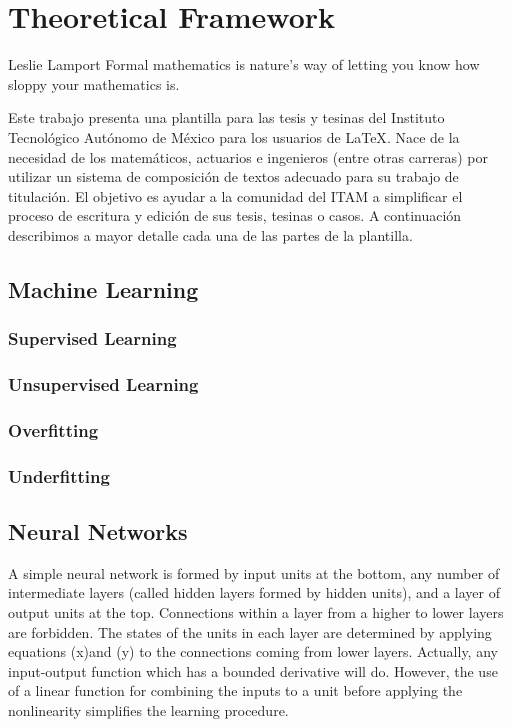 \chapter{Theoretical Framework}
\label{ch:teo}

\begin{chapterquote}{Leslie Lamport}
	Formal mathematics is nature's way of letting you know how sloppy
your mathematics is.
\end{chapterquote}

Este trabajo presenta una plantilla para las tesis y tesinas del Instituto Tecnológico Autónomo de México para los usuarios de \LaTeX \cite{lamport1994latex}. Nace de la necesidad de los matemáticos, actuarios e ingenieros (entre otras carreras) por utilizar un sistema de composición de textos adecuado para su trabajo de titulación. El objetivo es ayudar a la comunidad del ITAM a simplificar el proceso de escritura y edición de sus tesis, tesinas o casos. A continuación describimos a mayor detalle cada una de las partes de la plantilla.


\section{Machine Learning}
\subsection{Supervised Learning}
\subsection{Unsupervised Learning}
\subsection{Overfitting}
\subsection{Underfitting}

\section{Neural Networks}
A simple neural network is formed by input units at the bottom, any number of intermediate layers (called hidden layers formed by hidden units), and a layer of output units at the top. Connections within a layer from a higher to lower layers are forbidden. The states of the units in each layer are determined by applying equations (x)and (y) to the connections coming from lower layers. Actually, any input-output function which has a bounded derivative will do. However, the use of a linear function for combining the inputs to a unit before applying the nonlinearity simplifies the learning procedure\cite{polk2002cognitive}. 

